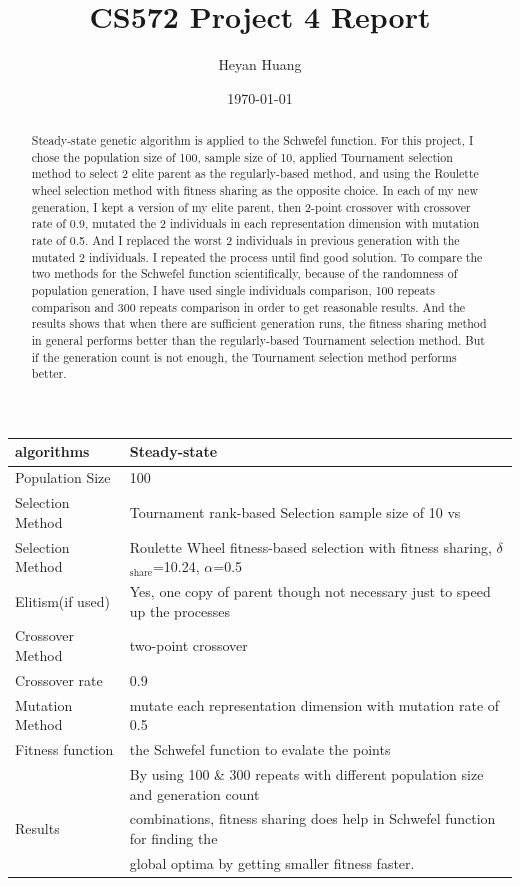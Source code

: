 \documentclass[10pt,b5paper]{article}
\author{Heyan Huang}
\date{\today}
\title{CS572 Project 4 Report}
\begin{document}
\maketitle
\tableofcontents

\begin{abstract}
Steady-state genetic algorithm is applied to the Schwefel function. For this project, I chose the population size of 100, sample size of 10, applied Tournament selection method to select 2 elite parent as the regularly-based method, and using the Roulette wheel selection method with fitness sharing as the opposite choice. In each of my new generation, I kept a version of my elite parent, then 2-point crossover with crossover rate of 0.9, mutated the 2 individuals in each representation dimension with mutation rate of 0.5. And I replaced the worst 2 individuals in previous generation with the mutated 2 individuals. I repeated the process until find good solution. To compare the two methods for the Schwefel function scientifically, because of the randomness of population generation, I have used single individuals comparison, 100 repeats comparison and 300 repeats comparison in order to get reasonable results. And the results shows that when there are sufficient generation runs, the fitness sharing method in general performs better than the regularly-based Tournament selection method. But if the generation count is not enough, the Tournament selection method performs better. 
\end{abstract}

\begin{center}
\begin{tabular}{ll}
\hline
algorithms & Steady-state\\
\hline
Population Size & 100\\
Selection Method & Tournament rank-based Selection sample size of 10 vs\\
Selection Method & Roulette Wheel fitness-based selection with fitness sharing, $\delta$$_{\text{share}}$=10.24, $\alpha$=0.5\\
Elitism(if used) & Yes, one copy of parent though not necessary just to speed up the processes\\
Crossover Method & two-point crossover\\
Crossover rate & 0.9\\
Mutation Method & mutate each representation dimension with mutation rate of 0.5\\
Fitness function & the Schwefel function to evalate the points\\
\hline
 & By using 100 \& 300 repeats with different population size and generation count\\
Results & combinations, fitness sharing does help in Schwefel function for finding the\\
 & global optima by getting smaller fitness faster.\\
\hline
\end{tabular}
\end{center}
\end{document}
